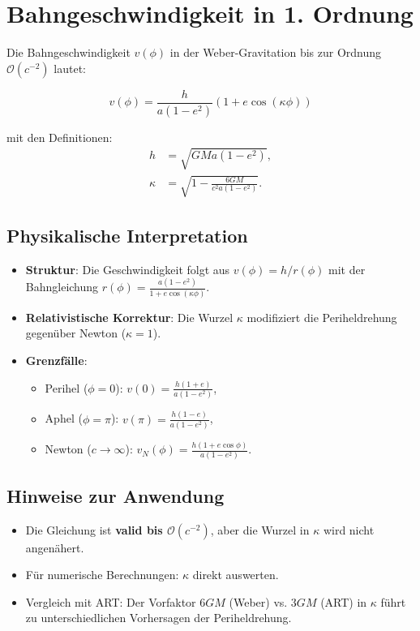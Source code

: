 \newpage
\section{Bahngeschwindigkeit in 1. Ordnung}
Die Bahngeschwindigkeit \(v(\phi)\) in der Weber-Gravitation bis zur Ordnung \(\mathcal{O}(c^{-2})\) lautet:

\begin{equation}
v(\phi) = \frac{h}{a(1 - e^2)} \left(1 + e \cos\left(\kappa\phi\right)\right)
\end{equation}

\noindent mit den Definitionen:
\begin{align*}
h &= \sqrt{GMa(1 - e^2)}, \\
\kappa &= \sqrt{1 - \frac{6GM}{c^2a(1 - e^2)}}.
\end{align*}

\subsection*{Physikalische Interpretation}
\begin{itemize}
    \item \textbf{Struktur}: Die Geschwindigkeit folgt aus \(v(\phi) = h/r(\phi)\) mit der Bahngleichung \(r(\phi) = \frac{a(1 - e^2)}{1 + e \cos(\kappa\phi)}\).
    \item \textbf{Relativistische Korrektur}: Die Wurzel \(\kappa\) modifiziert die Periheldrehung gegenüber Newton (\(\kappa = 1\)).
    \item \textbf{Grenzfälle}:
        \begin{itemize}
            \item Perihel (\(\phi = 0\)): \(v(0) = \frac{h(1 + e)}{a(1 - e^2)}\),
            \item Aphel (\(\phi = \pi\)): \(v(\pi) = \frac{h(1 - e)}{a(1 - e^2)}\),
            \item Newton (\(c \to \infty\)): \(v_N(\phi) = \frac{h(1 + e \cos\phi)}{a(1 - e^2)}\).
        \end{itemize}
\end{itemize}

\subsection*{Hinweise zur Anwendung}
\begin{itemize}
    \item Die Gleichung ist \textbf{valid bis \(\mathcal{O}(c^{-2})\)}, aber die Wurzel in \(\kappa\) wird nicht angenähert.
    \item Für numerische Berechnungen: \(\kappa\) direkt auswerten.
    \item Vergleich mit ART: Der Vorfaktor \(6GM\) (Weber) vs. \(3GM\) (ART) in \(\kappa\) führt zu unterschiedlichen Vorhersagen der Periheldrehung.
\end{itemize}

